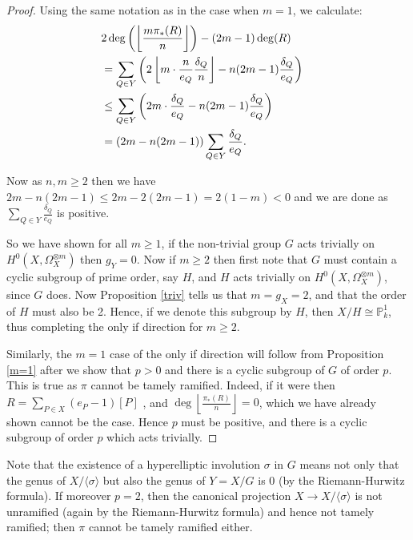 \begin{proof}
    Using the same notation as in the case when $m=1$, we calculate:
      \begin{align*}
	\lefteqn{2\deg\left(\left\lfloor\frac{m\pi_*(R)}{n}\right\rfloor\right)-(2m-1)\deg(R)}\\
	& = \sum_{Q \in Y} \left(2\left\lfloor m\cdot \frac{n}{e_Q}\frac{\delta_Q}{n}\right\rfloor -n(2m-1)\frac{\delta_Q}{e_Q}\right) \\
	&\leq   \sum_{Q\in Y}\left( 2m\cdot\frac{\delta_Q}{e_Q}-n(2m-1)\frac{\delta_Q}{e_Q}\right) \\
	& =  (2m-n(2m-1))\sum_{Q\in Y }\frac{\delta_Q}{e_Q}.
      \end{align*}

    Now as $n,m\geq 2$ then we have $2m-n(2m-1)\leq 2m-2(2m-1)=2(1-m)<0$ and we are done as $\sum_{Q\in Y}\frac{\delta_Q}{e_Q}$ is positive.

    So we have shown for all $m\geq 1$, if the non-trivial group $G$ acts trivially  on $H^0(X,\Omega_X^{\otimes m})$ then $g_Y=0$.
    Now if $m\geq 2$ then first note that $G$ must contain a cyclic subgroup of prime order, say $H$, and $H$ acts trivially on $H^0(X,\Omega_X^{\otimes m})$, since $G$ does.
    Now Proposition \ref{triv} tells us that $m=g_X=2$, and that the order of $H$ must also be 2.
    Hence, if we denote this subgroup by $H$, then $X/H\cong \mathbb{P}_k^1$, thus completing the only if direction for $m\geq 2$.
    
    Similarly, the $m=1$ case of the only if direction will follow from Proposition \ref{m=1} after we show that $p>0$ and there is a cyclic subgroup of $G$ of order $p$. 
    This is true as $\pi$ cannot be tamely ramified.
    Indeed, if it were then $R=\sum_{P\in X} (e_P-1)[P]$ \cite[Cor 2.4,Ch IV]{hart}, and $\deg\left\lfloor \frac{\pi_*(R)}{n} \right\rfloor=0$, which we have already shown cannot be the case.
    Hence $p$ must be positive, and there is a cyclic subgroup of order $p$ which acts trivially.
  \end{proof}

\begin{rem}
  Note that the existence of a hyperelliptic involution $\sigma$ in $G$ means not only that the genus of $X/\langle \sigma \rangle$ but also the genus of $Y=X/G$ is $0$ (by the Riemann-Hurwitz formula).
  If moreover $p=2$, then the canonical projection $X\rightarrow X/\langle \sigma \rangle$ is not unramified (again by the Riemann-Hurwitz formula) and hence not tamely ramified; then $\pi$ cannot be tamely ramified either.
\end{rem}

